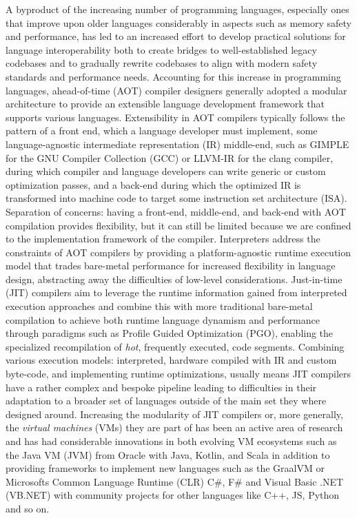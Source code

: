 A byproduct of the increasing number of programming languages, especially ones that improve upon older languages considerably in aspects such as memory safety and performance, has led to an increased effort to develop practical solutions for language interoperability both to create bridges to well-established legacy codebases and to gradually rewrite codebases to align with modern safety standards and performance needs. Accounting for this increase in programming languages, ahead-of-time (AOT) compiler designers generally adopted a modular architecture to provide an extensible language development framework that supports various languages. Extensibility in AOT compilers typically follows the pattern of a front end, which a language developer must implement, some language-agnostic intermediate representation (IR) middle-end, such as GIMPLE for the GNU Compiler Collection (GCC) or LLVM-IR for the clang compiler, during which compiler and language developers can write generic or custom optimization passes, and a back-end during which the optimized IR is transformed into machine code to target some instruction set architecture (ISA). Separation of concerns: having a front-end, middle-end, and back-end with AOT compilation provides flexibility, but it can still be limited because we are confined to the implementation framework of the compiler. Interpreters address the constraints of AOT compilers by providing a platform-agnostic runtime execution model that trades bare-metal performance for increased flexibility in language design, abstracting away the difficulties of low-level considerations. Just-in-time (JIT) compilers aim to leverage the runtime information gained from interpreted execution approaches and combine this with more traditional bare-metal compilation to achieve both runtime language dynamism and performance through paradigms such as Profile Guided Optimization (PGO), enabling the specialized recompilation of \textit{hot}, frequently executed, code segments. Combining various execution models: interpreted, hardware compiled with IR and custom byte-code, and implementing runtime optimizations, usually means JIT compilers have a rather complex and bespoke pipeline leading to difficulties in their adaptation to a broader set of languages outside of the main set they where designed around. Increasing the modularity of JIT compilers or, more generally, the \textit{virtual machines} (VMs) they are part of has been an active area of research and has had considerable innovations in both evolving VM ecosystems such as the Java VM (JVM) from Oracle with Java, Kotlin, and Scala in addition to providing frameworks to implement new languages such as the GraalVM \cite{graalvm2025introduction} or Microsofts Common Language Runtime (CLR) \cite{microsoft2023clr} C\#, F\# and Visual Basic .NET (VB.NET) with community projects for other languages like C++, JS, Python and so on.  
 
